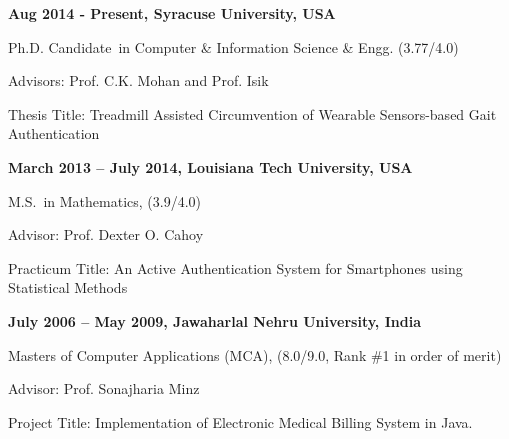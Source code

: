 
\hspace{-0.5in}\textbf{Aug 2014 - Present, Syracuse University, USA }

\hspace{-0.4in}Ph.D. Candidate~in Computer \& Information Science \& Engg. (3.77/4.0)

\hspace{-0.4in}Advisors: Prof. C.K. Mohan and Prof. Isik 

\hspace{-0.4in}Thesis Title: Treadmill Assisted Circumvention of Wearable Sensors-based Gait Authentication

\hspace{-0.5in}\textbf{March 2013 -- July 2014, Louisiana Tech University, USA }

\hspace{-0.4in}M.S.~in Mathematics, (3.9/4.0)

\hspace{-0.4in}Advisor: Prof. Dexter O. Cahoy 

\hspace{-0.4in}Practicum Title: An Active Authentication System for Smartphones using Statistical Methods

\hspace{-0.5in}\textbf{July 2006 -- May 2009, Jawaharlal Nehru University, India}

\hspace{-0.4in}Masters of Computer Applications (MCA), (8.0/9.0, Rank \#1 in order of merit)

\hspace{-0.4in}Advisor: Prof. Sonajharia Minz

\hspace{-0.4in}Project Title: Implementation of Electronic Medical Billing System in Java.

